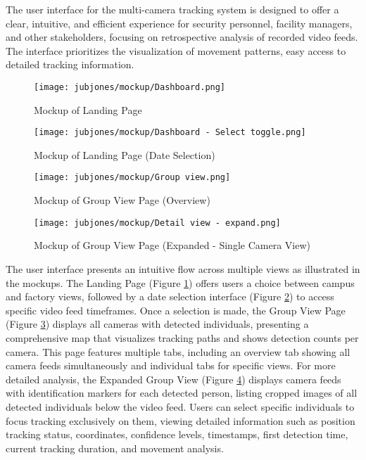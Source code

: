 The user interface for the multi-camera tracking system is designed to offer a clear, intuitive, and efficient experience for security personnel, facility managers, and other stakeholders, focusing on retrospective analysis of recorded video feeds.  The interface prioritizes the visualization of movement patterns, easy access to detailed tracking information.

\begin{figure}[h!]
    \centering
    \texttt{[image: jubjones/mockup/Dashboard.png]}
    \caption{Mockup of Landing Page}
    \label{fig:mockup-landing-page}
\end{figure}

\begin{figure}[h!]
    \centering
    \texttt{[image: jubjones/mockup/Dashboard - Select toggle.png]}
    \caption{Mockup of Landing Page (Date Selection)}
        \label{fig:mockup-landing-page-datetime}
\end{figure}

\begin{figure}[h!]
    \centering
    \texttt{[image: jubjones/mockup/Group view.png]}
    \caption{Mockup of Group View Page (Overview)}
    \label{fig:mockup-group-view}
\end{figure}

\begin{figure}[h!]
    \centering
    \texttt{[image: jubjones/mockup/Detail view - expand.png]} %
    \caption{Mockup of Group View Page (Expanded - Single Camera View)}
    \label{fig:mockup-group-view-expanded}
\end{figure}
\clearpage

The user interface presents an intuitive flow across multiple views as illustrated in the mockups. The Landing Page (Figure \ref{fig:mockup-landing-page}) offers users a choice between campus and factory views, followed by a date selection interface (Figure \ref{fig:mockup-landing-page-datetime}) to access specific video feed timeframes. Once a selection is made, the Group View Page (Figure \ref{fig:mockup-group-view}) displays all cameras with detected individuals, presenting a comprehensive map that visualizes tracking paths and shows detection counts per camera. This page features multiple tabs, including an overview tab showing all camera feeds simultaneously and individual tabs for specific views. For more detailed analysis, the Expanded Group View (Figure \ref{fig:mockup-group-view-expanded}) displays camera feeds with identification markers for each detected person, listing cropped images of all detected individuals below the video feed. Users can select specific individuals to focus tracking exclusively on them, viewing detailed information such as position tracking status, coordinates, confidence levels, timestamps, first detection time, current tracking duration, and movement analysis.

